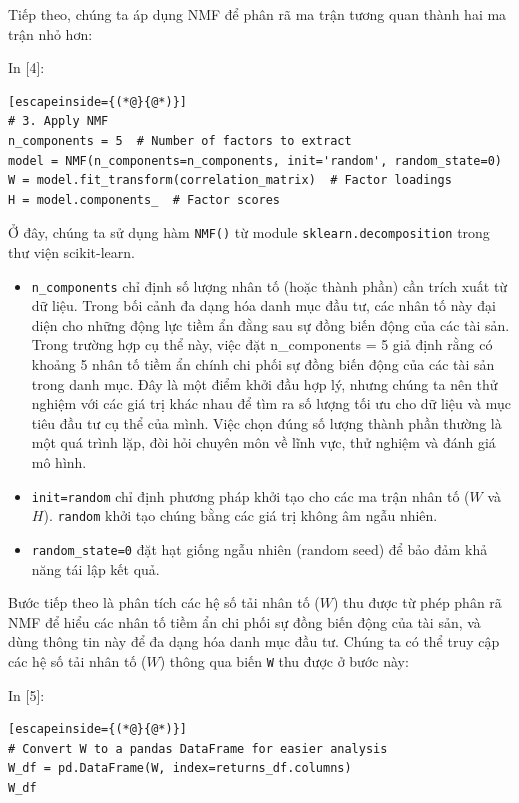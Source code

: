 Tiếp theo, chúng ta áp dụng NMF để phân rã ma trận tương quan thành hai ma trận nhỏ hơn:

In {[}4{]}:

\begin{lstlisting}[escapeinside={(*@}{@*)}]
# 3. Apply NMF
n_components = 5  # Number of factors to extract
model = NMF(n_components=n_components, init='random', random_state=0)
W = model.fit_transform(correlation_matrix)  # Factor loadings
H = model.components_  # Factor scores
\end{lstlisting}

Ở đây, chúng ta sử dụng hàm \texttt{NMF()} từ module \texttt{sklearn.decomposition} trong thư viện scikit-learn.

\begin{itemize}
\item
  \texttt{n\_components} chỉ định số lượng nhân tố (hoặc thành phần) cần trích xuất từ dữ liệu. Trong bối cảnh đa dạng hóa danh mục đầu tư, các nhân tố này đại diện cho những động lực tiềm ẩn đằng sau sự đồng biến động của các tài sản. Trong trường hợp cụ thể này, việc đặt n\_components = 5 giả định rằng có khoảng 5 nhân tố tiềm ẩn chính chi phối sự đồng biến động của các tài sản trong danh mục. Đây là một điểm khởi đầu hợp lý, nhưng chúng ta nên thử nghiệm với các giá trị khác nhau để tìm ra số lượng tối ưu cho dữ liệu và mục tiêu đầu tư cụ thể của mình. Việc chọn đúng số lượng thành phần thường là một quá trình lặp, đòi hỏi chuyên môn về lĩnh vực, thử nghiệm và đánh giá mô hình.
\item
  \texttt{init=\textquotesingle{}random\textquotesingle{}} chỉ định phương pháp khởi tạo cho các ma trận nhân tố (\(W\) và \(H\)). \texttt{\textquotesingle{}random\textquotesingle{}} khởi tạo chúng bằng các giá trị không âm ngẫu nhiên.
\item
  \texttt{random\_state=0} đặt hạt giống ngẫu nhiên (random seed) để bảo đảm khả năng tái lập kết quả.
\end{itemize}

Bước tiếp theo là phân tích các hệ số tải nhân tố (\(W\)) thu được từ phép phân rã NMF để hiểu các nhân tố tiềm ẩn chi phối sự đồng biến động của tài sản, và dùng thông tin này để đa dạng hóa danh mục đầu tư. Chúng ta có thể truy cập các hệ số tải nhân tố (\(W\)) thông qua biến \texttt{W} thu được ở bước này:

In {[}5{]}:

\begin{lstlisting}[escapeinside={(*@}{@*)}]
# Convert W to a pandas DataFrame for easier analysis
W_df = pd.DataFrame(W, index=returns_df.columns)
W_df
\end{lstlisting}

